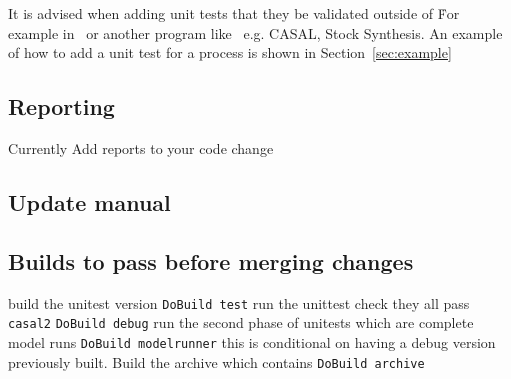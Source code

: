 It is advised when adding unit tests that they be validated outside of \CNAME\. For example in \R\ or another program like \CNAME\ e.g. CASAL, Stock Synthesis. An example of how to add a unit test for a process is shown in Section~\ref{sec:example}

\subsection{Reporting}
Currently 
Add reports to your code change

\subsection{Update manual}

\subsection{Builds to pass before merging changes}
build the unitest version
\texttt{DoBuild test}
run the unittest check they all pass
\texttt{casal2}
\texttt{DoBuild debug}
run the second phase of unitests which are complete model runs
\texttt{DoBuild modelrunner}
this is conditional on having a debug version previously built.
Build the archive which contains
\texttt{DoBuild archive}


